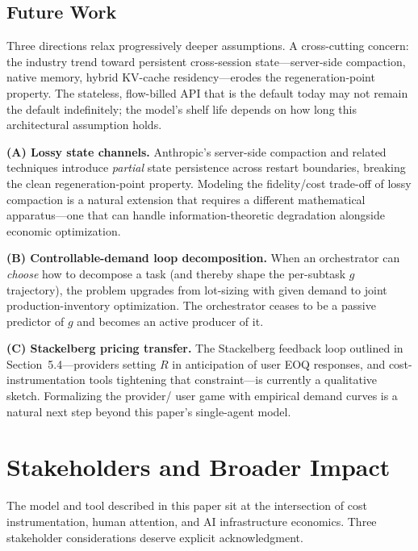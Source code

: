 \documentclass[11pt]{article}
\theoremstyle{definition}
\theoremstyle{remark}
\begin{document}
\subsection{Future Work}

Three directions relax progressively deeper assumptions. A cross-cutting concern: the industry trend toward persistent cross-session state---server-side compaction, native memory, hybrid KV-cache residency---erodes the regeneration-point property. The stateless, flow-billed API that is the default today may not remain the default indefinitely; the model's shelf life depends on how long this architectural assumption holds.

\textbf{(A) Lossy state channels.} Anthropic's server-side compaction and related techniques introduce \emph{partial} state persistence across restart boundaries, breaking the clean regeneration-point property. Modeling the fidelity/cost trade-off of lossy compaction is a natural extension that requires a different mathematical apparatus---one that can handle information-theoretic degradation alongside economic optimization.

\textbf{(B) Controllable-demand loop decomposition.} When an orchestrator can \emph{choose} how to decompose a task (and thereby shape the per-subtask $g$ trajectory), the problem upgrades from lot-sizing with given demand to joint production-inventory optimization. The orchestrator ceases to be a passive predictor of $g$ and becomes an active producer of it.

\textbf{(C) Stackelberg pricing transfer.} The Stackelberg feedback loop outlined in Section~5.4---providers setting $R$ in anticipation of user EOQ responses, and cost-instrumentation tools tightening that constraint---is currently a qualitative sketch. Formalizing the provider/ user game with empirical demand curves is a natural next step beyond this paper's single-agent model.

\section{Stakeholders and Broader Impact}

The model and tool described in this paper sit at the intersection of cost instrumentation, human attention, and AI infrastructure economics. Three stakeholder considerations deserve explicit acknowledgment.
\end{document}
